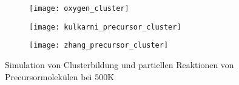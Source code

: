 \begin{figure}[p]

  \captionsetup[subfigure]{singlelinecheck=false}
  \begin{subfigure}[t]{4cm}
    \texttt{[image: oxygen\_cluster]}
  \end{subfigure}
  \hfill
  \begin{subfigure}[t]{5.5cm}
    \texttt{[image: kulkarni\_precursor\_cluster]}
  \end{subfigure}
  \hfill
  \begin{subfigure}[t]{4.5cm}
    \texttt{[image: zhang\_precursor\_cluster]}
  \end{subfigure}

  \caption[ mit : Clusterbildung und partielle Reaktionen]{Simulation von Clusterbildung und partiellen Reaktionen von Precursormolekülen bei 500K}
  \label{fig:precursorclusters}

\end{figure}

